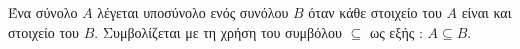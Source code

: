 Ένα σύνολο $ A $ λέγεται υποσύνολο ενός συνόλου $ B $ όταν κάθε στοιχείο του $ A $ είναι και στοιχείο του $ B $. Συμβολίζεται με τη χρήση του συμβόλου $ \subseteq $ ως εξής : $ A\subseteq B $.

